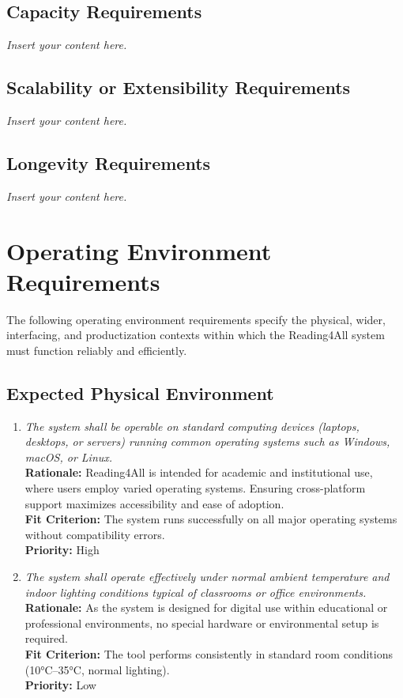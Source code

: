 \documentclass[12pt]{article}
\newcommand{\lips}{\textit{Insert your content here.}}
\begin{document}
\subsection{Capacity Requirements}
\lips
\subsection{Scalability or Extensibility Requirements}
\lips
\subsection{Longevity Requirements}
\lips
\section{Operating Environment Requirements}

The following operating environment requirements specify the physical, wider, interfacing, and productization contexts within which the Reading4All system must function reliably and efficiently.

\subsection{Expected Physical Environment}

\begin{enumerate}[label=OER-EP\arabic*., wide=0pt, leftmargin=*]
  \item \emph{The system shall be operable on standard computing devices (laptops, desktops, or servers) running common operating systems such as Windows, macOS, or Linux.}\\[2mm]
    {\bf Rationale:} Reading4All is intended for academic and institutional use, where users employ varied operating systems. Ensuring cross-platform support maximizes accessibility and ease of adoption.\\
    {\bf Fit Criterion:} The system runs successfully on all major operating systems without compatibility errors.\\
    {\bf Priority:} High

  \item \emph{The system shall operate effectively under normal ambient temperature and indoor lighting conditions typical of classrooms or office environments.}\\[2mm]
    {\bf Rationale:} As the system is designed for digital use within educational or professional environments, no special hardware or environmental setup is required.\\
    {\bf Fit Criterion:} The tool performs consistently in standard room conditions (10°C–35°C, normal lighting).\\
    {\bf Priority:} Low
\end{enumerate}
\end{document}
